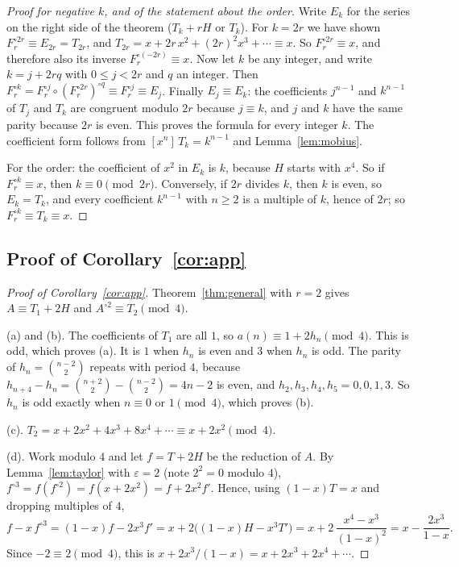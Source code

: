 \documentclass[11pt,a4paper]{article}
\theoremstyle{definition}
\theoremstyle{remark}
\newcommand{\coeff}[2]{[x^{#1}]\,#2}
\begin{document}
\begin{proof}[Proof for negative $k$, and of the statement about the order]
Write $E_k$ for the series on the right side of the theorem ($T_k+rH$ or $T_k$). For $k=2r$ we have shown
$F_r^{\circ 2r}\equiv E_{2r}=T_{2r}$, and $T_{2r}=x+2r\,x^2+(2r)^2x^3+\cdots\equiv x$. So $F_r^{\circ2r}\equiv x$, and
therefore also its inverse $F_r^{\circ(-2r)}\equiv x$. Now let $k$ be any integer, and write $k=j+2rq$ with
$0\le j<2r$ and $q$ an integer. Then $F_r^{\circ k}=F_r^{\circ j}\circ(F_r^{\circ 2r})^{\circ q}\equiv F_r^{\circ j}\equiv E_j$.
Finally $E_j\equiv E_k$: the coefficients $j^{n-1}$ and $k^{n-1}$ of $T_j$ and $T_k$ are congruent modulo $2r$
because $j\equiv k$, and $j$ and $k$ have the same parity because $2r$ is even. This proves the formula for every
integer $k$. The coefficient form follows from $\coeff{n}{T_k}=k^{n-1}$ and Lemma~\ref{lem:mobius}.

For the order: the coefficient of $x^2$ in $E_k$ is $k$, because $H$ starts with $x^4$. So if $F_r^{\circ k}\equiv x$,
then $k\equiv0\pmod{2r}$. Conversely, if $2r$ divides $k$, then $k$ is even, so $E_k=T_k$, and every coefficient
$k^{n-1}$ with $n\ge2$ is a multiple of $k$, hence of $2r$; so $F_r^{\circ k}\equiv T_k\equiv x$.
\end{proof}

\subsection{Proof of Corollary~\ref{cor:app}}

\begin{proof}[Proof of Corollary~\ref{cor:app}]
Theorem~\ref{thm:general} with $r=2$ gives $A\equiv T_1+2H$ and $A^{\circ2}\equiv T_2\pmod4$.

(a) and (b). The coefficients of $T_1$ are all $1$, so $a(n)\equiv1+2h_n\pmod4$. This is odd, which proves (a). It
is $1$ when $h_n$ is even and $3$ when $h_n$ is odd. The parity of $h_n=\binom{n-2}{2}$ repeats with period $4$,
because $h_{n+4}-h_n=\binom{n+2}{2}-\binom{n-2}{2}=4n-2$ is even, and $h_2,h_3,h_4,h_5=0,0,1,3$. So $h_n$ is odd
exactly when $n\equiv0$ or $1\pmod4$, which proves (b).

(c). $T_2=x+2x^2+4x^3+8x^4+\cdots\equiv x+2x^2\pmod4$.

(d). Work modulo $4$ and let $f=T+2H$ be the reduction of $A$. By Lemma~\ref{lem:taylor} with $\varepsilon=2$
(note $2^2=0$ modulo $4$), $f^{\circ3}=f(f^{\circ2})=f(x+2x^2)=f+2x^2f'$. Hence, using $(1-x)T=x$ and dropping
multiples of $4$,
\[
f-x\,f^{\circ3}=(1-x)f-2x^3f'=x+2\bigl((1-x)H-x^3T'\bigr)=x+2\,\frac{x^4-x^3}{(1-x)^2}=x-\frac{2x^3}{1-x}.
\]
Since $-2\equiv2\pmod4$, this is $x+2x^3/(1-x)=x+2x^3+2x^4+\cdots$.
\end{proof}
\end{document}
